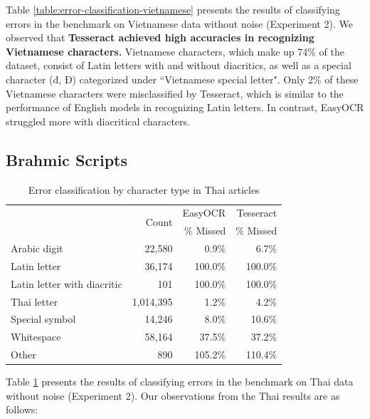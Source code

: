 \documentclass[12pt,oneside]{memoir}
\begin{document}
Table \ref{table:error-classification-vietnamese} presents the results of classifying errors in the benchmark on Vietnamese data without noise (Experiment 2). 
We observed that \textbf{Tesseract achieved high accuracies in recognizing Vietnamese characters.} 
Vietnamese characters, which make up 74\% of the dataset, consist of Latin letters with and without diacritics, as well as a special character (đ, Đ) categorized under ``Vietnamese special letter".
Only 2\% of these Vietnamese characters were misclassified by Tesseract, which is similar to the performance of English models in recognizing Latin letters.
In contrast, EasyOCR struggled more with diacritical characters.

\subsection{Brahmic Scripts}

\begin{table}[ht]
    \caption{Error classification by character type in Thai articles}
    \label{table:error-classification-thai}
    \centering
    \begin{tabular}{lrrr}
        \toprule
        & \multirow{2}{*}{Count} & EasyOCR & Tesseract\\
        & & \% Missed & \% Missed\\
        \midrule
        Arabic digit & 22,580 & \cellcolor{LightRed!1}0.9\% & \cellcolor{LightRed!7}6.7\% \\
        Latin letter & 36,174 & \cellcolor{LightRed!100}100.0\% & \cellcolor{LightRed!100}100.0\% \\
        Latin letter with diacritic & 101 & \cellcolor{LightRed!100}100.0\% & \cellcolor{LightRed!100}100.0\% \\
        Thai letter & 1,014,395 & \cellcolor{LightRed!1}1.2\% & \cellcolor{LightRed!4}4.2\% \\
        Special symbol & 14,246 & \cellcolor{LightRed!8}8.0\% & \cellcolor{LightRed!11}10.6\% \\
        Whitespace & 58,164 & \cellcolor{LightRed!37}37.5\% & \cellcolor{LightRed!37}37.2\% \\
        Other & 890 & \cellcolor{LightRed!105}105.2\% & \cellcolor{LightRed!110}110.4\% \\
        \bottomrule
    \end{tabular}
\end{table}

Table \ref{table:error-classification-thai} presents the results of classifying errors in the benchmark on Thai data without noise (Experiment 2). Our observations from the Thai results are as follows:
\end{document}
